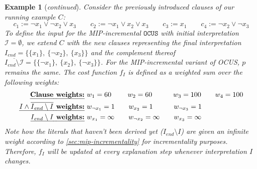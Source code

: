 \documentclass[twoside,11pt]{article}
\newcommand\m[1]{\mathcal{#1}}
\newtheorem{example}{Example}
\newcommand\comment[1]{\marginpar{\tiny #1}}
\renewcommand\comment[1]{#1}
\newcommand{\tias}[1]{{\comment{\color{blue}Tias:#1}}}
\newcommand\Iend{\ensuremath{I_\mathit{end} }\xspace}
\newcommand\formularunning{\ensuremath{C }\xspace}
\newcommand\mm[1]{\ensuremath{#1}\xspace}
\newcommand\call[1]{\mm{\texttt{#1}}}
\newcommand\comus{\mm{\call{OCUS}}}
\begin{document}
\begin{example}[\textit{continued}]\label{ex:ocus-incr:expl-seq} 
	Consider the previously introduced clauses of our running example $\formularunning$: 
	 \[ c_1 := \lnot x_1 \vee \lnot x_2 \vee x_3 \qquad  c_2 := \lnot x_1 \vee  x_2 \vee x_3 \qquad  c_3 := x_1 \qquad c_4 := \lnot x_2 \vee \lnot x_3 \]
	To define the input for the MIP-incremental \comus with initial interpretation $\m{I}=\emptyset$, we extend $\formularunning$ with the new clauses representing the final interpretation $\Iend =  \{ \{ x_1\},\  \{\lnot x_2\},\ \{ x_3\}\}$ and the complement thereof $\overline{\Iend \setminus \m{I}} =  \{ \{\lnot x_1\},\    \{ x_2\}, \   \{\lnot x_3\}\}$.
	For the MIP-incremental variant of OCUS, $p$ remains the same. The cost function $f_I $ is defined as a weighted sum over the following weights:
	\begin{align*}
	\text{\textbf{\emph{Clause weights:}}} & \ w_1 = 60 \  \qquad w_2=60  \qquad  \ \ \ w_3=100 \qquad w_4=100 \\
	\text{\textbf{\emph{$I \wedge \overline{\Iend \setminus I}$ weights:}}}& \  w_{\lnot x_1}=1  \qquad w_{ x_2}=1 \ \ \ \qquad w_{\lnot x_3}=1 \\
	\text{\textbf{\emph{$\Iend \setminus I$ weights:}}}& \  w_{x_1}=\infty  \qquad w_{\lnot x_2}=\infty \qquad w_{x_3}=\infty
	\end{align*}
	Note how the literals that haven't been derived yet ($\Iend \setminus I$) are given an infinite weight according to \cref{sec:mip-incrementality} for incrementality purposes.
	Therefore, $f_I$ will be updated at every explanation step whenever interpretation $I$ changes.

\end{example}
\end{document}
